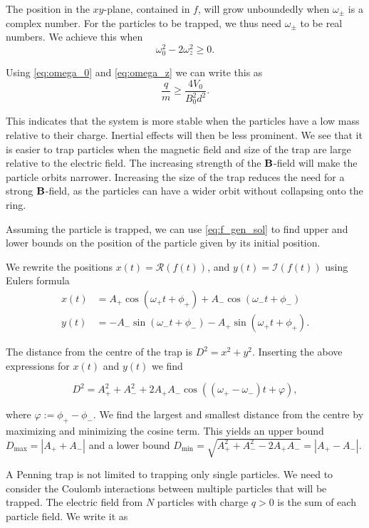The position in the $xy$-plane, contained in $f$, will grow unboundedly when $\omega_{\pm}$ is a
complex number.
For the particles to be trapped, we thus need $\omega_{\pm}$ to be real numbers. We achieve this when
\begin{equation}
\omega_0^2 - 2\omega_z^2 \geq 0.
\end{equation}

Using \autoref{eq:omega_0} and \autoref{eq:omega_z} we can write this as
\begin{equation}
\frac{q}{m} \geq \frac{4V_0}{B_0^2d^2}.
\end{equation}

This indicates that the system is more stable when the particles have a low mass relative to their charge.
Inertial effects will then be less prominent. We see that it is easier to trap particles when the magnetic
field and size of the trap are large relative to the electric field. The increasing strength of the $\bold{B}$-field
will make the particle orbits narrower. Increasing the size of the trap reduces the need for a strong $\bold{B}$-field,
as the particles can have a wider orbit without collapsing onto the ring.

Assuming the particle is trapped, we can use \autoref{eq:f_gen_sol} to find upper and lower bounds on the
position of the particle given by its initial position.

We rewrite the positions $x(t) = \mathcal{R}(f(t))$, and $y(t) = \mathcal{I}(f(t))$ using Eulers formula
\begin{align}
x(t) &= A_+ \cos(\omega_+t + \phi_+) + A_- \cos(\omega_-t + \phi_-) \\
y(t) &= -A_- \sin(\omega_- t + \phi_-) -A_+ \sin(\omega_+ t + \phi_+).
\end{align}

The distance from the centre of the trap is $D^2 = x^2 + y^2$. Inserting the above expressions for
$x(t)$ and $y(t)$ we find

\begin{equation}
D^2 = A_+^2 + A_-^2 + 2A_+A_-\cos((\omega_+ - \omega_-)t + \varphi),
\end{equation}

where $\varphi := \phi_+ - \phi_-.$
We find the largest and smallest distance from the centre by maximizing and minimizing the
cosine term. This yields an upper bound $D_{\text{max}} = |A_{+} + A_{-}|$ and a lower bound
$D_{\text{min}} =  \sqrt{A_+^2 + A_-^2 - 2A_+A_-} = |A_+ - A_-|$.

A Penning trap is not limited to trapping only single particles. We need to
consider the Coulomb interactions between multiple particles that will be trapped. The electric field from $N$
particles with charge $q>0$ is the sum of each particle field. We write it as

